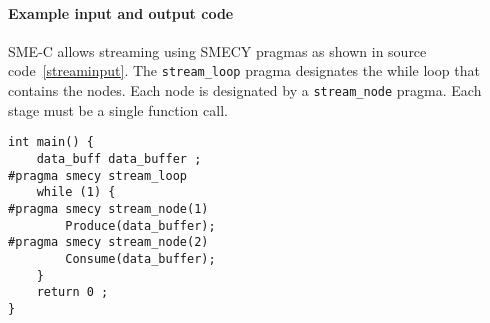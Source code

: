 \documentclass[a4paper]{article}
\begin{document}
	\paragraph{Example input and output code}
	SME-C allows streaming using SMECY pragmas as shown in source code~\ref{streaminput}. The \verb+stream_loop+ pragma designates the while loop that contains the nodes. Each node is designated by a \verb+stream_node+ pragma. Each stage must be a single function call.
	
	\begin{lstlisting}[label=streaminput,caption={Input code with
streaming pragmas. The definitions of \texttt{Produce} and \texttt{Consume} functions are not shown.}]
int main() {
	data_buff data_buffer ;
#pragma smecy stream_loop
	while (1) {
#pragma smecy stream_node(1)
		Produce(data_buffer);
#pragma smecy stream_node(2)
		Consume(data_buffer);
	}
	return 0 ;
}
	\end{lstlisting}
	
\end{document}
